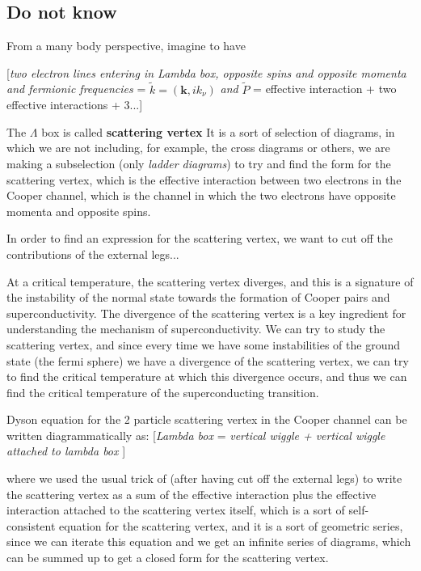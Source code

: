 \subsection{Do not know}

From a many body perspective, imagine to have

    [\textit{two electron lines entering in Lambda box, opposite spins and opposite momenta and fermionic frequencies} = \(\tilde{k}= (\mathbf{k}, ik_\nu)\) \textit{and} \(\tilde{P}\) = effective interaction + two effective interactions + 3...]

The \(\Lambda\) box is called \textbf{scattering vertex}
It is a sort of selection of diagrams, in which we are not including, for example, the cross diagrams or others, we are making a subselection (only \textit{ladder diagrams}) to try and find the form for the scattering vertex, which is the effective interaction between two electrons in the Cooper channel, which is the channel in which the two electrons have opposite momenta and opposite spins.

In order to find an expression for the scattering vertex, we want to cut off the contributions of the external legs...

At a critical temperature, the scattering vertex diverges, and this is a signature of the instability of the normal state towards the formation of Cooper pairs and superconductivity. The divergence of the scattering vertex is a key ingredient for understanding the mechanism of superconductivity. We can try to study the scattering vertex, and since every time we have some instabilities of the ground state (the fermi sphere) we have a divergence of the scattering vertex, we can try to find the critical temperature at which this divergence occurs, and thus we can find the critical temperature of the superconducting transition.

Dyson equation for the 2 particle scattering vertex in the Cooper channel can be written diagrammatically as:
[\textit{Lambda box} = \textit{vertical wiggle + vertical wiggle attached to lambda box }]

where we used the usual trick of (after having cut off the external legs) to write the scattering vertex as a sum of the effective interaction plus the effective interaction attached to the scattering vertex itself, which is a sort of self-consistent equation for the scattering vertex, and it is a sort of geometric series, since we can iterate this equation and we get an infinite series of diagrams, which can be summed up to get a closed form for the scattering vertex.

